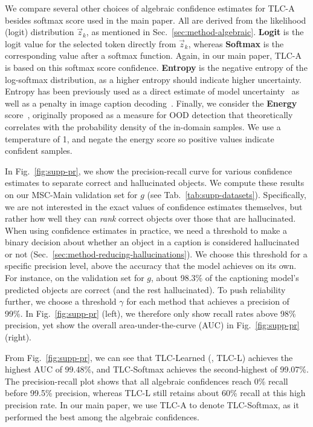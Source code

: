\documentclass[10pt,twocolumn,letterpaper]{article}
\newcommand{\figref}[1]{Fig.\xspace~\ref{#1}}
\newcommand{\tabref}[1]{Tab.\xspace~\ref{#1}}
\newcommand{\secref}[1]{Sec.\xspace~\ref{#1}}
\newcommand{\ApproachName}{TLC\xspace}
\begin{document}
We compare several other choices of algebraic confidence estimates for \ApproachName-A besides softmax score used in the main paper. All are derived from the likelihood (logit) distribution $\vec z_k$, as mentioned in \secref{sec:method-algebraic}. \textbf{Logit} is the logit value for the selected token directly from $\vec z_k$, whereas \textbf{Softmax} is the corresponding value after a softmax function. Again, in our main paper, \ApproachName-A is based on this softmax score confidence.
\textbf{Entropy} is the negative entropy of the log-softmax distribution, as a higher entropy should indicate higher uncertainty. Entropy has been previously used as a direct estimate of model uncertainty~\cite{wang2020tent} as well as a penalty in image caption decoding~\cite{xiao2021hallucination}. Finally, we consider the \textbf{Energy} score~\cite{liu2020energy}, originally proposed as a measure for OOD detection that theoretically correlates with the probability density of the in-domain samples. We use a temperature of 1, and negate the energy score so positive values indicate confident samples. 

In \figref{fig:supp-pr}, we show the precision-recall curve for various confidence estimates to separate correct and hallucinated objects. We compute these results on our MSC-Main validation set for $g$ (see \tabref{tab:supp-datasets}). Specifically, we are not interested in the exact values of confidence estimates themselves, but rather how well they can \textit{rank} correct objects over those that are hallucinated. When using confidence estimates in practice, we need a threshold to make a binary decision about whether an object in a caption is considered hallucinated or not (\secref{sec:method-reducing-hallucinations}). We choose this threshold for a specific precision level, above the accuracy that the model achieves on its own. For instance, on the validation set for $g$, about 98.3\% of the captioning model's predicted objects are correct (and the rest hallucinated). To push reliability further, we choose a threshold $\gamma$ for each method that achieves a precision of 99\%. In \figref{fig:supp-pr} (left), we therefore only show recall rates above 98\% precision, yet show the overall area-under-the-curve (AUC) in \figref{fig:supp-pr} (right).

From \figref{fig:supp-pr}, we can see that \ApproachName-Learned (\ie, \ApproachName-L) achieves the highest AUC of 99.48\%, and \ApproachName-Softmax achieves the second-highest of 99.07\%. The precision-recall plot shows that all algebraic confidences reach 0\% recall before 99.5\% precision, whereas \ApproachName-L still retains about 60\% recall at this high precision rate. In our main paper, we use \ApproachName-A to denote \ApproachName-Softmax, as it performed the best among the algebraic confidences.
\end{document}
